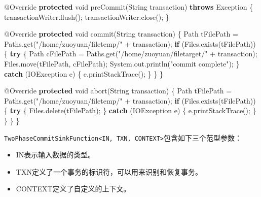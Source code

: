 \documentclass[cn,11pt,chinese]{elegantbook}
\newenvironment{Shaded}{}{}
\newcommand{\AttributeTok}[1]{\textcolor[rgb]{0.49,0.56,0.16}{#1}}
\newcommand{\BuiltInTok}[1]{#1}
\newcommand{\DataTypeTok}[1]{\textcolor[rgb]{0.56,0.13,0.00}{#1}}
\newcommand{\FunctionTok}[1]{\textcolor[rgb]{0.02,0.16,0.49}{#1}}
\newcommand{\KeywordTok}[1]{\textcolor[rgb]{0.00,0.44,0.13}{\textbf{#1}}}
\newcommand{\NormalTok}[1]{#1}
\newcommand{\StringTok}[1]{\textcolor[rgb]{0.25,0.44,0.63}{#1}}
\providecommand{\tightlist}{%
  \setlength{\itemsep}{0pt}\setlength{\parskip}{0pt}}
\begin{document}
\begin{Shaded}
\begin{Highlighting}[]
    \AttributeTok{@Override}
    \KeywordTok{protected} \DataTypeTok{void} \FunctionTok{preCommit}\NormalTok{(}\BuiltInTok{String}\NormalTok{ transaction) }\KeywordTok{throws} \BuiltInTok{Exception}\NormalTok{ \{}
\NormalTok{        transactionWriter.}\FunctionTok{flush}\NormalTok{();}
\NormalTok{        transactionWriter.}\FunctionTok{close}\NormalTok{();}
\NormalTok{    \}}

    \AttributeTok{@Override}
    \KeywordTok{protected} \DataTypeTok{void} \FunctionTok{commit}\NormalTok{(}\BuiltInTok{String}\NormalTok{ transaction) \{}
\NormalTok{        Path tFilePath = Paths.}\FunctionTok{get}\NormalTok{(}\StringTok{"/home/zuoyuan/filetemp/"}\NormalTok{ + transaction);}
        \KeywordTok{if}\NormalTok{ (Files.}\FunctionTok{exists}\NormalTok{(tFilePath)) \{}
            \KeywordTok{try}\NormalTok{ \{}
\NormalTok{                Path cFilePath = Paths.}\FunctionTok{get}\NormalTok{(}\StringTok{"/home/zuoyuan/filetarget/"}\NormalTok{ + transaction);}
\NormalTok{                Files.}\FunctionTok{move}\NormalTok{(tFilePath, cFilePath);}
                \BuiltInTok{System}\NormalTok{.}\FunctionTok{out}\NormalTok{.}\FunctionTok{println}\NormalTok{(}\StringTok{"commit complete"}\NormalTok{);}
\NormalTok{            \} }\KeywordTok{catch}\NormalTok{ (}\BuiltInTok{IOException}\NormalTok{ e) \{}
\NormalTok{                e.}\FunctionTok{printStackTrace}\NormalTok{();}
\NormalTok{            \}}
\NormalTok{        \}}
\NormalTok{    \}}

    \AttributeTok{@Override}
    \KeywordTok{protected} \DataTypeTok{void} \FunctionTok{abort}\NormalTok{(}\BuiltInTok{String}\NormalTok{ transaction) \{}
\NormalTok{        Path tFilePath = Paths.}\FunctionTok{get}\NormalTok{(}\StringTok{"/home/zuoyuan/filetemp/"}\NormalTok{ + transaction);}
        \KeywordTok{if}\NormalTok{ (Files.}\FunctionTok{exists}\NormalTok{(tFilePath)) \{}
            \KeywordTok{try}\NormalTok{ \{}
\NormalTok{                Files.}\FunctionTok{delete}\NormalTok{(tFilePath);}
\NormalTok{            \} }\KeywordTok{catch}\NormalTok{ (}\BuiltInTok{IOException}\NormalTok{ e) \{}
\NormalTok{                e.}\FunctionTok{printStackTrace}\NormalTok{();}
\NormalTok{            \}}
\NormalTok{        \}}
\NormalTok{    \}}
\NormalTok{\}}
\end{Highlighting}
\end{Shaded}

\texttt{TwoPhaseCommitSinkFunction\textless{}IN,\ TXN,\ CONTEXT\textgreater{}}包含如下三个范型参数：

\begin{itemize}
\tightlist
\item
  IN表示输入数据的类型。
\item
  TXN定义了一个事务的标识符，可以用来识别和恢复事务。
\item
  CONTEXT定义了自定义的上下文。
\end{itemize}
\end{document}
